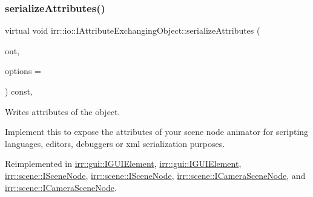 \subsubsection{\texorpdfstring{serialize\+Attributes()}{serializeAttributes()}\hspace{0.1cm}{\footnotesize\ttfamily [1/2]}}
{\footnotesize\ttfamily virtual void irr\+::io\+::\+I\+Attribute\+Exchanging\+Object\+::serialize\+Attributes (\begin{DoxyParamCaption}\item[{\hyperlink{classirr_1_1io_1_1IAttributes}{io\+::\+I\+Attributes} $\ast$}]{out,  }\item[{\hyperlink{structirr_1_1io_1_1SAttributeReadWriteOptions}{io\+::\+S\+Attribute\+Read\+Write\+Options} $\ast$}]{options = {} }\end{DoxyParamCaption}) const\hspace{0.3cm}{\ttfamily [inline]}, {\ttfamily [virtual]}}



Writes attributes of the object. 

Implement this to expose the attributes of your scene node animator for scripting languages, editors, debuggers or xml serialization purposes. 

Reimplemented in \hyperlink{classirr_1_1gui_1_1IGUIElement_ac575f2f817b05733dbc667ff298f6e78}{irr\+::gui\+::\+I\+G\+U\+I\+Element}, \hyperlink{classirr_1_1gui_1_1IGUIElement_ac575f2f817b05733dbc667ff298f6e78}{irr\+::gui\+::\+I\+G\+U\+I\+Element}, \hyperlink{classirr_1_1scene_1_1ISceneNode_a3210345b70227c03c7f889c94754fdaa}{irr\+::scene\+::\+I\+Scene\+Node}, \hyperlink{classirr_1_1scene_1_1ISceneNode_a3210345b70227c03c7f889c94754fdaa}{irr\+::scene\+::\+I\+Scene\+Node}, \hyperlink{classirr_1_1scene_1_1ICameraSceneNode_a0a78a29638be1665ee5dba22c2c3b846}{irr\+::scene\+::\+I\+Camera\+Scene\+Node}, and \hyperlink{classirr_1_1scene_1_1ICameraSceneNode_a0a78a29638be1665ee5dba22c2c3b846}{irr\+::scene\+::\+I\+Camera\+Scene\+Node}.

\mbox{\label{classirr_1_1io_1_1IAttributeExchangingObject_a587f7b633366968f0488e1099e9172ef}} 
